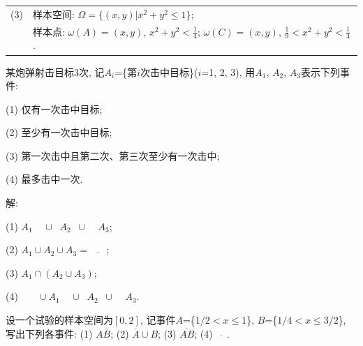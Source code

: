 \documentclass[standard]{ExBook}
\begin{document}
\begin{qitems}
\begin{bbox}
\begin{flushleft}
\begin{tabular}{ll}
(3) &样本空间: $\Omega=\{(x,y)|x^2+y^2 \leq 1\}$;\\
 &样本点: $\omega(A)=(x,y)$, $x^2+y^2 < \frac{1}{4}$; $\omega(C)=(x,y)$, $\frac{1}{9} < x^2+y^2 < \frac{1}{4}$.
\end{tabular}
\end{flushleft}
    \end{bbox}

\vspace{-5em}

    \begin{bbox}
    \begin{shaded}
        \qitem 
某炮弹射击目标3次, 记$A_{i}$=\{第$i$次击中目标\}($i$=1, 2, 3), 用$A_{1}$, $A_{2}$, $A_{3}$表示下列事件:

(1) 仅有一次击中目标;

(2) 至少有一次击中目标;

(3) 第一次击中且第二次、第三次至少有一次击中;

(4) 最多击中一次.
    \end{shaded}
    \end{bbox}

\vspace{-5em}

    \begin{bbox}
解: 

(1) $A_{1}\mathop{\overline{A_{2}}}\mathop{\overline{A_{3}}}\cup\mathop{\overline{A_{1}}}A_{2}\mathop{\overline{A_{3}}}\cup\mathop{\overline{A_{1}}}\mathop{\overline{A_{2}}}A_{3}$;

(2) $A_{1}\cup A_{2}\cup A_{3}=\overline{\mathop{\overline{A_{1}}}\mathop{\overline{A_{2}}}\mathop{\overline{A_{3}}}}$;

(3) $A_{1}\cap(A_{2}\cup A_{3})$;

(4) $\mathop{\overline{A_{1}}}\mathop{\overline{A_{2}}}\mathop{\overline{A_{3}}}\cup A_{1}\mathop{\overline{A_{2}}}\mathop{\overline{A_{3}}}\cup \mathop{\overline{A_{1}}}A_{2}\mathop{\overline{A_{3}}}\cup\mathop{\overline{A_{1}}}\mathop{\overline{A_{2}}}A_{3}$.
    \end{bbox}

\vspace{-5em}

    \begin{bbox}
    \begin{shaded}
        \qitem
设一个试验的样本空间为$[0,2]$, 记事件$A$=\{$1/2 < x \leq 1$\}, $B$=\{$1/4 < x \leq 3/2$\}, 写出下列各事件:
(1) $A\overline{B}$;\qquad
(2) $\overline{A}\cup B$;\qquad
(3) $\overline{AB}$;\qquad
(4) $\overline{\mathop{\overline{A}}\mathop{\overline{B}}}$.
    \end{shaded}
    \end{bbox}


\end{qitems}
\end{document}
